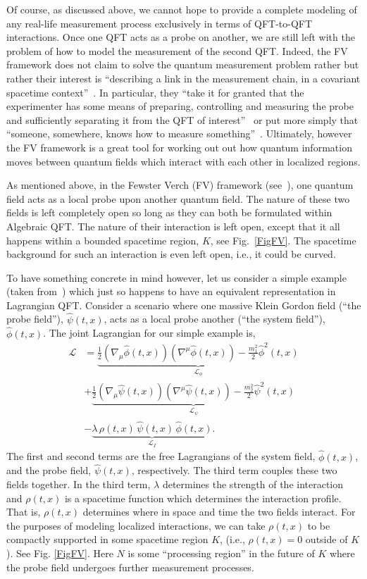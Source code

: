 \documentclass[prd,twocolumn,superscriptaddress,floatfix,amsmath,amssymb,amsfonts,nofootinbib]{revtex4-2}
\begin{document}
Of course, as discussed above, we cannot hope to provide a complete modeling of any real-life measurement process exclusively in terms of QFT-to-QFT interactions. Once one QFT acts as a probe on another, we are still left with the problem of how to model the measurement of the second QFT. Indeed, the FV framework does not claim to solve the quantum measurement problem rather but rather their interest is ``describing a link in the measurement chain, in a covariant spacetime context''~\cite{fewster1}. In particular, they ``take it for granted that the experimenter has some means of preparing, controlling and measuring the probe and sufficiently separating it from the QFT of interest''~\cite{fewster1} or put more simply that ``someone, somewhere, knows how to measure something''~\cite{FewsterRQITalk3}. Ultimately, however the FV framework is a great tool for working out out how quantum information moves between quantum fields which interact with each other in localized regions.

As mentioned above, in the Fewster Verch (FV) framework (see~\cite{fewster1,fewster2,fewster3,Ruep2021}), one quantum field  acts as a local probe upon another quantum field. The nature of these two fields is left completely open so long as they can both be formulated within Algebraic QFT. The nature of their interaction is left open, except that it all happens within a bounded spacetime region, $K$, see Fig.~\ref{FigFV}. The spacetime background for such an interaction is even left open, i.e., it could be curved. 

To have something concrete in mind however, let us consider a simple example (taken from~\cite{fewster1,Ruep2021}) which just so happens to have an equivalent representation in Lagrangian QFT. Consider a scenario where one massive Klein Gordon field (``the probe field''), $\hat\psi(t,x)$, acts as a local probe another (``the system field''), $\hat\phi(t,x)$. The joint Lagrangian for our simple example is,
\begin{align}\label{LagrangianFV}
\mathcal{L}
&=\underbrace{\frac{1}{2}(\nabla_\mu\hat\phi(t,x))(\nabla^\mu\hat\phi(t,x))
-\frac{m_1^2}{2}\hat\phi^2(t,x)}_{\mathcal{L}_\phi}\\
\nonumber
&+\underbrace{\frac{1}{2}(\nabla_\mu\hat\psi(t,x))(\nabla^\mu\hat\psi(t,x))
-\frac{m_2^2}{2}\hat\psi^2(t,x)}_{\mathcal{L}_\psi}\\
\nonumber
&-\underbrace{\lambda\,\rho(t,x)\,\hat\psi(t,x)\,\hat\phi(t,x)}_{\mathcal{L}_I}.    
\end{align}
The first and second terms are the free Lagrangians of the system field, $\hat\phi(t,x)$, and the probe field, $\hat\psi(t,x)$, respectively. The third term couples these two fields together. In the third term, $\lambda$ determines the strength of the interaction and $\rho(t,x)$ is a spacetime function which determines the interaction profile. That is, $\rho(t,x)$ determines where in space and time the two fields interact. For the purposes of modeling localized interactions, we can take $\rho(t,x)$ to be compactly supported in some spacetime region $K$, (i.e., $\rho(t,x)=0$ outside of $K$). See Fig. \ref{FigFV}. Here $N$ is some ``processing region'' in the future of $K$ where the probe field undergoes further measurement processes. 
\end{document}
